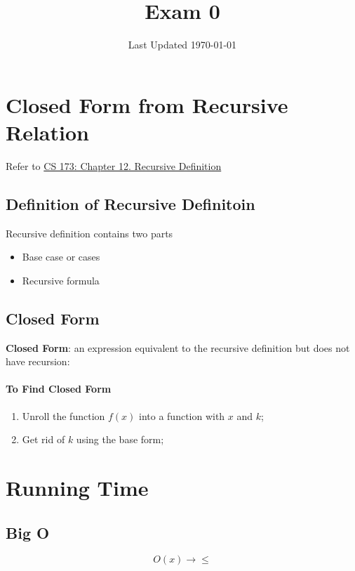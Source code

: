 \documentclass[letterpaper, 11pt]{article}
\title{Exam 0}
\date{Last Updated \today}
\begin{document}
  \maketitle
  \tableofcontents
  
  \section{Closed Form from Recursive Relation}
  
    Refer to \href{http://mfleck.cs.illinois.edu/building-blocks/version-1.3/recursive-definition.pdf}
    {CS 173: Chapter 12. Recursive Definition}
    
    \subsection{Definition of Recursive Definitoin} 
      Recursive definition contains two parts
      \begin{itemize}
        \item Base case or cases
        \item Recursive formula
      \end{itemize}
    
    \subsection{Closed Form}
      \textbf{Closed Form}: an expression equivalent to the recursive definition but
      does not have recursion:
    
      \paragraph{To Find Closed Form}
      \begin{enumerate}
        \item Unroll the function $ f(x) $ into a function with $ x $ and $ k $;
        \item Get rid of $ k $ using the base form;
      \end{enumerate}
    
  \section{Running Time}
    \subsection{Big O} 
    
      \begin{equation}
         O \left( x \right) \to \leq
      \end{equation}
    
\end{document}
